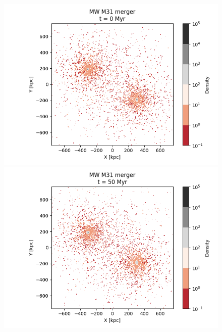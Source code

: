 \documentclass[a4paper,12pt, english]{article}
\begin{document}
\begin{figure}[!ht]
\centering
\begin{minipage}{0.45\textwidth}
  \centering
\includegraphics[width=1\textwidth]{simulations-plots/mw_m31_cmerger_0000.png}
\end{minipage}
\begin{minipage}{0.45\textwidth}
  \centering
\includegraphics[width=1\textwidth]{simulations-plots/mw_m31_cmerger_0010.png}
\end{minipage}
\begin{minipage}{0.45\textwidth}
  \centering

\end{minipage}
\end{figure}
\end{document}
